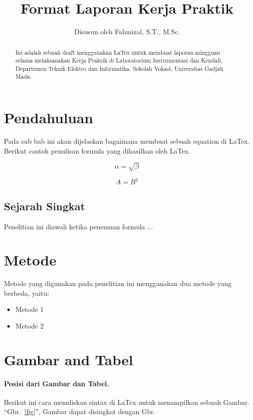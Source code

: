 \documentclass{article}
\begin{document}
	
	
	\title{Format Laporan Kerja Praktik}
	\author{Disusun oleh Fahmizal, S.T., M.Sc.}
	\maketitle
	
	\begin{abstract}
		Ini adalah sebuah draft menggunakan LaTex untuk membuat laporan mingguan selama melaksanakan Kerja Praktik di Laboratorium Instrumentasi dan Kendali, Departemen Teknik Elektro dan Informatika, Sekolah Vokasi, Universitas Gadjah Mada. 
	\end{abstract}
	
	
	\section{Pendahuluan} 
	Pada sub bab ini akan dijelaskan bagaimana membuat sebuah equation di LaTex. Berikut contoh penulisan formula yang dihasilkan oleh LaTex.
	
	\begin{equation}
	\label{simple_equation}
	\alpha = \sqrt{ \beta }
	\end{equation}
	
	\begin{equation}
	\label{simple_equation}
	A=B^2
	\end{equation}
	
	\subsection{Sejarah Singkat}
	Penelitian ini diawali ketika penemuan formula ...
	
	\section{Metode}
	Metode yang digunakan pada penelitian ini menggunakan dua metode yang berbeda, yaitu:
	\begin{itemize}
		\item Metode 1
		\item Metode 2
		
	\end{itemize}
	
	\section{Gambar and Tabel}
	\paragraph{Posisi dari Gambar dan Tabel.} 	Berikut ini cara menuliskan sintax di LaTex untuk menampilkan sebuah Gambar.	``Gbr.~\ref{fig}'', Gambar dapat disingkat dengan Gbr.
	
\end{document}

